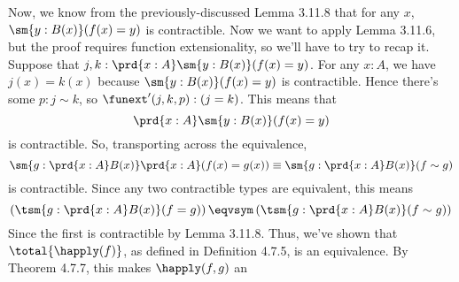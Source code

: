 Now, we know from the previously-discussed Lemma 3.11.8 that for any $x$,
$\sm{y:B(x)} (f(x) = y)$ is contractible.  Now we want to apply Lemma 3.11.6,
but the proof requires function extensionality, so we'll have to try to recap
it.  Suppose that $j, k : \prd{x:A}\sm{y:B(x)}(f(x)=y)$.  For any $x : A$, we
have $j(x) = k(x)$ because $\sm{y:B(x)}(f(x) = y)$ is contractible.  Hence
there's some $p: j \sim k$, so $\funext'(j, k, p) : (j=k)$.  This means that
\[
  \prd{x:A}\sm{y:B(x)} (f(x) = y)
\]
is contractible.  So, transporting across the equivalence,
\[
  \sm{g:\prd{x:A}B(x)}\prd{x:A}(f(x) = g(x))
  \equiv
  \sm{g:\prd{x:A}B(x)}(f \sim g)
\]
is contractible.  Since any two contractible types are equivalent, this means
\[
  \left(\tsm{g:\prd{x:A}B(x)} (f=g)\right)   
  \eqvsym
  \left(\tsm{g:\prd{x:A}B(x)} (f \sim g)\right)   
\]
Since the first is contractible by Lemma 3.11.8.  Thus, we've shown
that $\total{\happly(f)}$, as defined in Definition 4.7.5, is an
equivalence.  By Theorem 4.7.7, this makes $\happly(f, g)$ an
